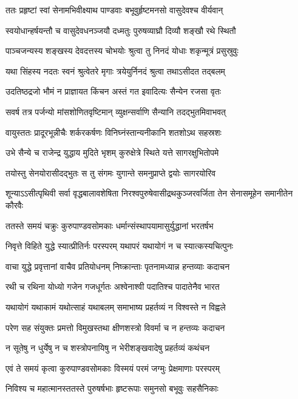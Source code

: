 \twolineshloka
{ततः प्रहृष्टां स्वां सेनामभिवीक्ष्याथ पाण्डवाः}
{बभूवुर्हृष्टमनसो वासुदेवश्च वीर्यवान्}


\twolineshloka
{स्वयोधान्हर्षयन्तौ च वासुदेवधनञ्जयौ}
{दध्मतुः पुरुषव्याघ्रौ दिव्यौ शङ्खौ रथे स्थितौ}


\twolineshloka
{पाञ्चजन्यस्य शङ्खस्य देवदत्तस्य चोभयोः}
{श्रुत्वा तु निनदं योधाः शकृन्मूत्रं प्रसुस्रुवुः}


\twolineshloka
{यथा सिंहस्य नदतः स्वनं श्रुत्वेतरे मृगाः}
{त्रयेयुर्निनदं श्रुत्वा तथाऽसीदत तद्बलम्}


\twolineshloka
{उदतिष्ठद्रजो भौमं न प्राज्ञायत किंचन}
{अस्तं गत इवादित्यः सैन्येन रजसा वृतः}


\twolineshloka
{सवर्ष तत्र पर्जन्यो मांसशोणितवृष्टिमान्}
{व्युक्षन्सर्वाणि सैन्यानि तदद्भुतमिवाभवत्}


\twolineshloka
{वायुस्ततः प्रादूरभून्नीचैः शर्करकर्षणः}
{विनिघ्नंस्तान्यनीकानि शतशोऽथ सहस्रशः}


\twolineshloka
{उभे सैन्ये च राजेन्द्र युद्धाय मुदिते भृशम्}
{कुरुक्षेत्रे स्थिते यत्ते सागरक्षुभितोपमे}


\twolineshloka
{तयोस्तु सेनयोरासीदद्भुतः स तु संगमः}
{युगान्ते समनुप्राप्ते द्वयोः सागरयोरिव}


\threelineshloka
{शून्याऽऽसीत्पृथिवी सर्वा वृद्धबालावशेषिता}
{निरश्वपुरुषेवासीद्रथकुञ्जरवर्जिता}
{तेन सेनासमूहेन समानीतेन कौरवैः}


\twolineshloka
{ततस्ते समयं चक्रुः कुरुपाण्डवसोमकाः}
{धर्मान्संस्थापयामासुर्युद्धानां भरतर्षभ}


\twolineshloka
{निवृत्ते विहिते युद्धे स्यात्प्रीतिर्नः परस्परम्}
{यथापरं यथायोगं न च स्यात्कस्यचित्पुनः}


\twolineshloka
{वाचा युद्धे प्रवृत्तानां वाचैव प्रतियोधनम्}
{निष्क्रान्ताः पृतनामध्यान्न हन्तव्याः कदाचन}


\twolineshloka
{रथी च रथिना योध्यो गजेन गजधूर्गतः}
{अश्वेनाश्वी पदातिश्च पादातेनैव भारत}


\twolineshloka
{यथायोगं यथाकामं यथोत्साहं यथाबलम्}
{समाभाष्य प्रहर्तव्यं न विश्वस्ते न विह्वले}


\twolineshloka
{परेण सह संयुक्तः प्रमत्तो विमुखस्तथा}
{क्षीणशस्त्रो विवर्मा च न हन्तव्यः कदाचन}


\twolineshloka
{न सूतेषु न धुर्येषु न च शस्त्रोपनायिषु}
{न भेरीशङ्खवादेषु प्रहर्तव्यं कथंचन}


\twolineshloka
{एवं ते समयं कृत्वा कुरुपाण्डवसोमकाः}
{विस्मयं परमं जग्मुः प्रेक्षमाणाः परस्परम्}


\twolineshloka
{निविश्य च महात्मानस्ततस्ते पुरुषर्षभाः}
{हृष्टरूपाः समुनसो बभूवुः सहसैनिकाः}



